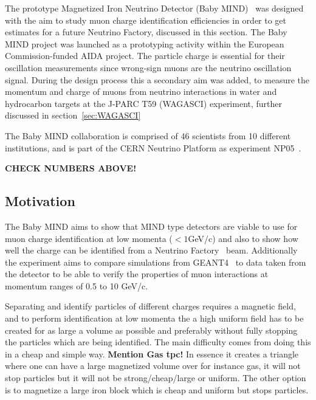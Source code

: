 
The prototype Magnetized Iron Neutrino Detector (Baby MIND)~\cite{26babyMIND} was designed with the aim to study muon charge identification efficiencies in order to get estimates for a future Neutrino Factory, discussed in this section. The Baby MIND project was launched as a prototyping activity within the European Commission-funded AIDA project. The particle charge is essential for their oscillation measurements since wrong-sign muons are the neutrino oscillation signal. During the design process this a secondary aim was added, to measure the momentum and charge of muons from neutrino interactions in water and hydrocarbon targets at the J-PARC T59 (WAGASCI) experiment, further discussed in section~\ref{sec:WAGASCI}

The Baby MIND collaboration is comprised of 46 scientists from 10 different institutions, and is part of the CERN Neutrino Platform as experiment NP05~\cite{Fix2}.

\textbf{CHECK NUMBERS ABOVE!}

\subsection{Motivation}

The Baby MIND aims to show that MIND type detectors are viable to use for muon charge identification at low momenta ($<1$GeV/c) and also to show how well the charge can be identified from a Neutrino Factory~\cite{25NUfact} beam. Additionally the experiment aims to compare simulations from GEANT4~\cite{Geant4} to data taken from the detector to be able to verify the properties of muon interactions at momentum ranges of 0.5 to 10 GeV/c.

Separating and identify particles of different charges requires a magnetic field, and to perform identification at low momenta the a high uniform field has to be created for as large a volume as possible and preferably without fully stopping the particles which are being identified. The main difficulty comes from doing this in a cheap and simple way. \textbf{Mention Gas tpc!} In essence it creates a triangle where one can have a large magnetized volume over for instance gas, it will not stop particles but it will not be strong/cheap/large or uniform. The other option is to magnetize a large iron block which is cheap and uniform but stops particles.

